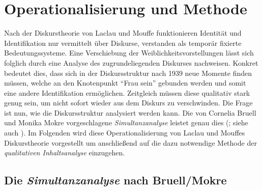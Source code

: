 \documentclass[12pt, titlepage=true, toc=bib]{scrartcl}
\begin{document}

\section{Operationalisierung und Methode}

Nach der Diskurstheorie von Laclau und Mouffe funktionieren Identität und Identifikation nur vermittelt über Diskurse, verstanden als temporär fixierte Bedeutungssysteme. Eine Verschiebung der Weiblichkeitsvorstellungen lässt sich folglich durch eine Analyse des zugrundeliegenden Diskurses nachweisen. Konkret bedeutet dies, dass sich in der Diskursstruktur nach 1939 neue Momente finden müssen, welche an den Knotenpunkt "`Frau sein"' gebunden werden und somit eine andere Identifikation ermöglichen. Zeitgleich müssen diese qualitativ stark genug sein, um nicht sofort wieder aus dem Diskurs zu verschwinden. Die Frage ist nun, wie die Diskursstruktur analysiert werden kann. Die von Cornelia Bruell und Monika Mokre vorgeschlagene \textit{Simultanzanalyse} leistet genau dies (\cite*{bruell_chancen_2006}; siehe auch \cite{nonhoff_kollektive_2007}). Im Folgenden wird diese Operationalisierung von Laclau und Mouffes Diskurstheorie vorgestellt um anschließend auf die dazu notwendige Methode der \textit{qualitativen Inhaltsanalyse} einzugehen.

\subsection{Die \textit{Simultanzanalyse} nach Bruell/Mokre}
\end{document}
